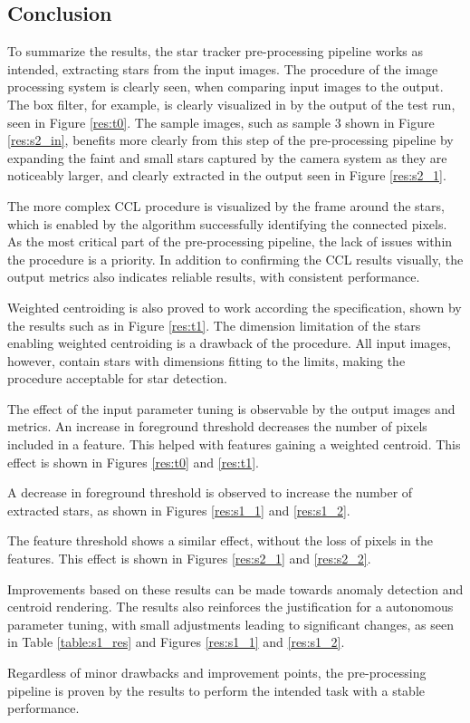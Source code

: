 \documentclass[12pt]{report}
\begin{document}
\subsection{Conclusion}
To summarize the results, the star tracker pre-processing pipeline works as intended, extracting stars from the input images. The procedure of the image processing system is clearly seen, when comparing input images to the output. The box filter, for example, is clearly visualized in by the output of the test run, seen in Figure \ref{res:t0}. The sample images, such as sample 3 shown in Figure \ref{res:s2_in}, benefits more clearly from this step of the pre-processing pipeline by expanding the faint and small stars captured by the camera system as they are noticeably larger, and clearly extracted in the output seen in Figure \ref{res:s2_1}.
\par
The more complex CCL procedure is visualized by the frame around the stars, which is enabled by the algorithm successfully identifying the connected pixels. As the most critical part of the pre-processing pipeline, the lack of issues within the procedure is a priority. In addition to confirming the CCL results visually, the output metrics also indicates reliable results, with consistent performance.
\par  
Weighted centroiding is also proved to work according the specification, shown by the results such as in Figure \ref{res:t1}. The dimension limitation of the stars enabling weighted centroiding is a drawback of the procedure. All input images, however, contain stars with dimensions fitting to the limits, making the procedure acceptable for star detection.
\par
The effect of the input parameter tuning is observable by the output images and metrics. An increase in foreground threshold decreases the number of pixels included in a feature. This helped with features gaining a weighted centroid. This effect is shown in Figures \ref{res:t0} and \ref{res:t1}.
\par
A decrease in foreground threshold is observed to increase the number of extracted stars, as shown in Figures \ref{res:s1_1} and \ref{res:s1_2}.
\par
The feature threshold shows a similar effect, without the loss of pixels in the features. This effect is shown in Figures \ref{res:s2_1} and \ref{res:s2_2}.
\par
Improvements based on these results can be made towards anomaly detection and centroid rendering. The results also reinforces the justification for a autonomous parameter tuning, with small adjustments leading to significant changes, as seen in Table \ref{table:s1_res} and Figures \ref{res:s1_1} and \ref{res:s1_2}.
\par
Regardless of minor drawbacks and improvement points, the pre-processing pipeline is proven by the results to perform the intended task with a stable performance. 
\end{document}
